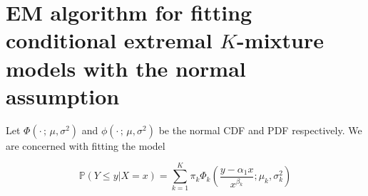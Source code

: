 \documentclass[11pt,twoside,openany]{book}
\newcommand{\p}{\mathbb{P}}
\newcommand{\D}{\mathcal{D}}
\numberwithin{Theorem}{chapter}
\numberwithin{Definition}{chapter}
\numberwithin{Lemma}{chapter}
\numberwithin{Algorithm}{chapter}
\numberwithin{equation}{chapter}
\begin{document}






\section{EM algorithm for fitting conditional extremal $K$-mixture models with the normal assumption}
\label{appendix:htnormalem}

Let $\Phi(\cdot\,;\,\mu,\sigma^2)$ and $\phi(\cdot\,;\,\mu,\sigma^2)$
be the normal CDF and PDF respectively.
We are concerned with fitting the model

\begin{equation}\label{eq:htemnormalass}
    \p\left(Y\leq y | X =x\right) = \sum_{k=1}^K
    \pi_k \Phi_k\left(\frac{y - \alpha_1 x}{x^{\beta_k}};\mu_k,\sigma_k^2\right)
\end{equation}
\end{document}
